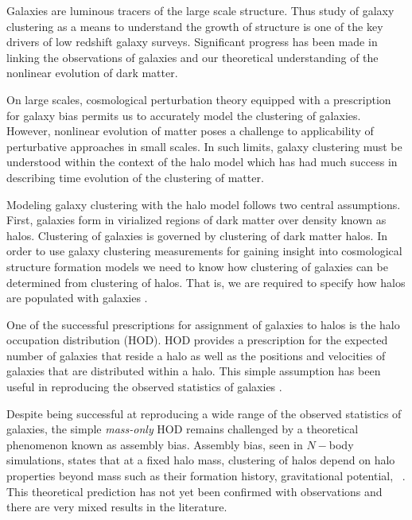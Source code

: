 Galaxies are luminous tracers of the large scale structure. Thus study of galaxy clustering as a means to understand the growth of structure is 
one of the key drivers of low redshift galaxy surveys. Significant progress has been made in linking the observations of 
galaxies and our theoretical understanding of the nonlinear evolution of dark matter. 

On large scales, cosmological perturbation theory equipped with a prescription for galaxy bias permits us 
to accurately model the clustering of galaxies. However, nonlinear evolution of matter 
poses a challenge to applicability of perturbative approaches in small scales. In such limits, 
galaxy clustering must be understood within the context of the halo model which has had 
much success in describing time evolution of the clustering of matter.  

Modeling galaxy clustering with the halo model follows two central assumptions. First, galaxies form in virialized regions of 
dark matter over density known as halos. Clustering of galaxies is governed by clustering of dark matter halos. 
In order to use galaxy clustering measurements for gaining insight into cosmological structure formation models we need to 
know how clustering of galaxies can be determined from clustering of halos. That is, we are required to specify how halos 
are populated with galaxies \citep{seljak2000,scoccimarro2001,berlind_weinberg2002}.

One of the successful prescriptions for assignment of galaxies to halos is the halo occupation distribution (HOD). 
HOD provides a prescription for the expected number of galaxies that reside a halo as well as 
the positions and velocities of galaxies that are distributed within a halo. This simple assumption has been useful 
in reproducing the observed statistics of galaxies \citep{tinker_rsd2007,zehavi2011,zheng_guo}.

Despite being successful at reproducing a wide range of the observed statistics of galaxies, the simple \emph{mass-only} HOD 
remains challenged by a theoretical phenomenon known as assembly bias. Assembly bias, seen in $N-$body simulations, states that at a fixed halo mass, clustering 
of halos depend on halo properties beyond mass such as their formation history, gravitational potential, \etc\ \citep{weschler2006,gao2007,arz2014,sunayama2016}.
This theoretical prediction has not yet been confirmed with observations and there are very mixed results in the literature.

